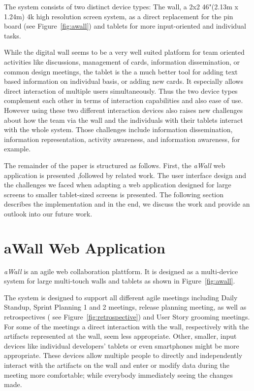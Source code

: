 \documentclass{sigchi}
\begin{document}
The system consists of two distinct device types: The wall, a 2x2 46"(2.13m x 1.24m) 4k high resolution screen system, as a direct replacement for the pin board (see Figure~\ref{fig:awall}) and tablets for more input-oriented and individual tasks.


While the digital wall seems to be a very well suited platform for team oriented activities like discussions, management of cards, information dissemination, or common design meetings, the tablet is the a much better tool for adding text based information on individual basis, or adding new cards. It especially allows direct interaction of multiple users simultaneously. 
Thus the two device types complement each other in terms of interaction capabilities and also ease of use. 
However using these two different interaction devices also raises new challenges about how the team via the wall and the individuals with their tablets interact with the whole system. Those challenges include information dissemination, information representation, activity awareness, and information awareness, for example.

The remainder of the paper is structured as follows.
First, the \textit{aWall} web application is presented ,followed by  related work. The user interface design and the challenges we faced when adapting a web application designed for large screens to smaller tablet-sized screens is presented.
The following section describes the implementation and in the end, we discuss the work and provide an outlook into our future work.


\section{aWall Web Application}

\textit{aWall} is an agile web collaboration plattform. It is designed as a multi-device system for  large multi-touch walls and tablets as shown in Figure~\ref{fig:awall}.

The system is designed to support all different agile meetings including Daily Standup, Sprint Planning 1 and 2 meetings, release planning meeting, as well as retrospectives ( see Figure~\ref{fig:retrospective}) and User Story grooming meetings. 
For some of the meetings a direct interaction with the wall, respectively with the artifacts represented at the wall, seem less appropriate. Other, smaller, input devices like individual developers' tablets or even smartphones might be more appropriate. These devices allow multiple people to directly and independently interact with the artifacts on the wall and enter or modify data during the meeting more comfortable; while everybody immediately seeing the changes made. 
\end{document}

